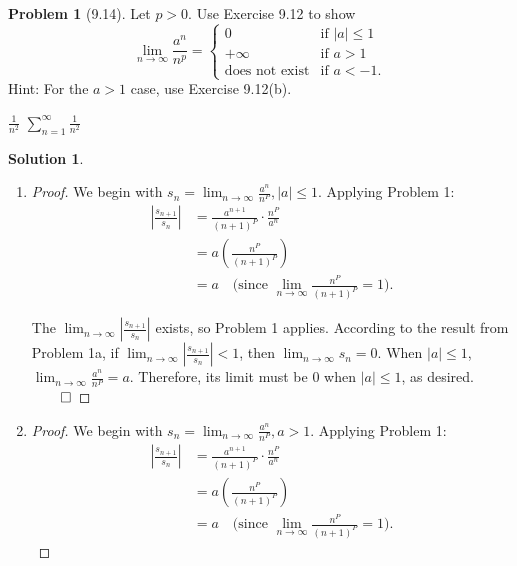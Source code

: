 \documentclass[12pt]{article}
\theoremstyle{definition} %
\newtheorem{solution}{Solution}
\newtheorem{problem}{Problem}
\theoremstyle{plain} %
\begin{document}
\begin{problem}[9.14]
    Let $p > 0$. Use Exercise 9.12 to show
    \[\lim_{n \to \infty} \frac{a^n}{n^p} = 
    \begin{cases} 
    0 & \text{if } |a| \leq 1 \\ 
    +\infty & \text{if } a > 1 \\ 
    \text{does not exist} & \text{if } a < -1.
    \end{cases}\]
    Hint: For the $a > 1$ case, use Exercise 9.12(b).

\end{problem}
$\frac{1}{n^{2}}$ 
$\sum_{n=1}^{\infty} \frac{1}{n^{2}}$ 
\begin{solution}
\begin{enumerate}
    \item\begin{proof}
        We begin with \(s_n = \lim_{n \to \infty} \frac{a^n}{n^P}, |a| \leq 1\). Applying Problem 1:
        \begin{align}
            \left| \frac{s_{n+1}}{s_n} \right| &= \frac{a^{n+1}}{(n+1)^P} \cdot \frac{n^P}{a^n} \tag{17} \\
            &= a \left( \frac{n^P}{(n+1)^P} \right) \tag{18} \\
            &= a \tag{19} \quad \text{(since } \lim_{n \to \infty} \frac{n^P}{(n+1)^P} = 1\text{)}.
        \end{align}
    
        The \(\lim_{n \to \infty} \left| \frac{s_{n+1}}{s_n} \right|\) exists, so Problem 1 applies. According to the result from Problem 1a, if \(\lim_{n \to \infty} \left| \frac{s_{n+1}}{s_n} \right| < 1\), then \(\lim_{n \to \infty} s_n = 0\). When \(|a| \leq 1\), \(\lim_{n \to \infty} \frac{a^n}{n^P} = a\). Therefore, its limit must be 0 when \(|a| \leq 1\), as desired. \(\qed\)
    \end{proof} 
    \item \begin{proof}
        We begin with \(s_n = \lim_{n \to \infty} \frac{a^n}{n^P}, a > 1\). Applying Problem 1:
        \begin{align}
            \left| \frac{s_{n+1}}{s_n} \right| &= \frac{a^{n+1}}{(n+1)^P} \cdot \frac{n^P}{a^n} \tag{20} \\
            &= a \left( \frac{n^P}{(n+1)^P} \right) \tag{21} \\
            &= a \tag{22} \quad \text{(since } \lim_{n \to \infty} \frac{n^P}{(n+1)^P} = 1\text{)}.
        \end{align}
    

\end{proof}
\end{enumerate}
\end{solution}
\end{document}
